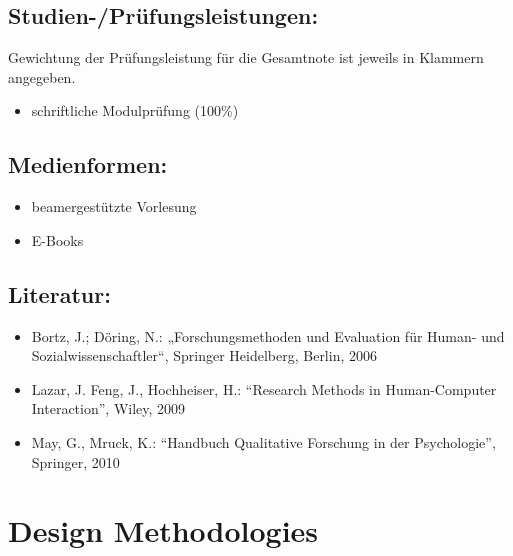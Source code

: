 \section*{Studien-/Prüfungsleistungen:}\label{studien-pruxfcfungsleistungen-3}

Gewichtung der Prüfungsleistung für die Gesamtnote ist jeweils in
Klammern angegeben.

\begin{itemize}
\tightlist
\item
  schriftliche Modulprüfung (100\%)
\end{itemize}

\section*{Medienformen:}\label{medienformen-3}

\begin{itemize}
\tightlist
\item
  beamergestützte Vorlesung
\item
  E-Books
\end{itemize}

\section*{Literatur:}\label{literatur-3}

\begin{itemize}
\tightlist
\item
  Bortz, J.; Döring, N.: „Forschungsmethoden und Evaluation für Human-
  und Sozialwissenschaftler``, Springer Heidelberg, Berlin, 2006
\item
  Lazar, J. Feng, J., Hochheiser, H.: ``Research Methods in
  Human-Computer Interaction'', Wiley, 2009
\item
  May, G., Mruck, K.: ``Handbuch Qualitative Forschung in der
  Psychologie'', Springer, 2010
\end{itemize}

\chapter{Design Methodologies}\label{design-methodologies}

